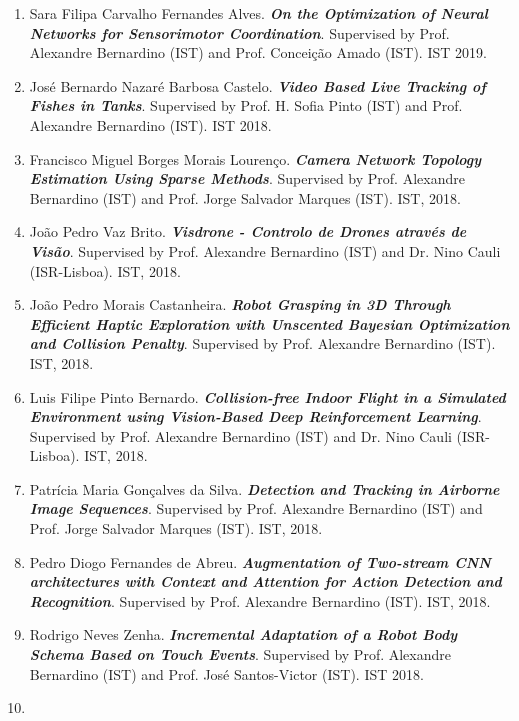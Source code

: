 \begin{enumerate}
  Rui Eduardo Marques Cardoso. \emph{\textbf{Feedback control of
  saccades on a model of a 3D biomimetic robot eye}}. Supervised by
  Prof. Alexandre Bernardino (IST) and Prof. John van Opstal (Radboud
  Univ., Nijmegen, Netherlands). IST 2019.
\item
  Sara Filipa Carvalho Fernandes Alves. \emph{\textbf{On the
  Optimization of Neural Networks for Sensorimotor Coordination}}.
  Supervised by Prof. Alexandre Bernardino (IST) and Prof. Conceição
  Amado (IST). IST 2019.
\item
  José Bernardo Nazaré Barbosa Castelo. \emph{\textbf{Video Based Live
  Tracking of Fishes in Tanks}}. Supervised by Prof. H. Sofia Pinto
  (IST) and Prof. Alexandre Bernardino (IST). IST 2018.
\item
  Francisco Miguel Borges Morais Lourenço. \emph{\textbf{Camera Network
  Topology Estimation Using Sparse Methods}}. Supervised by Prof.
  Alexandre Bernardino (IST) and Prof. Jorge Salvador Marques (IST).
  IST, 2018.
\item
  João Pedro Vaz Brito. \emph{\textbf{Visdrone - Controlo de Drones
  através de Visão}}. Supervised by Prof. Alexandre Bernardino (IST) and
  Dr. Nino Cauli (ISR-Lisboa). IST, 2018.
\item
  João Pedro Morais Castanheira. \emph{\textbf{Robot Grasping in 3D
  Through Efficient Haptic Exploration with Unscented Bayesian
  Optimization and Collision Penalty}}. Supervised by Prof. Alexandre
  Bernardino (IST). IST, 2018.
\item
  Luis Filipe Pinto Bernardo. \emph{\textbf{Collision-free Indoor Flight
  in a Simulated Environment using Vision-Based Deep Reinforcement
  Learning}}. Supervised by Prof. Alexandre Bernardino (IST) and Dr.
  Nino Cauli (ISR-Lisboa). IST, 2018.
\item
  Patrícia Maria Gonçalves da Silva. \emph{\textbf{Detection and
  Tracking in Airborne Image Sequences}}. Supervised by Prof. Alexandre
  Bernardino (IST) and Prof. Jorge Salvador Marques (IST). IST, 2018.
\item
  Pedro Diogo Fernandes de Abreu. \emph{\textbf{Augmentation of
  Two-stream CNN architectures with Context and Attention for Action
  Detection and Recognition}}. Supervised by Prof. Alexandre Bernardino
  (IST). IST, 2018.
\item
  Rodrigo Neves Zenha. \emph{\textbf{Incremental Adaptation of a Robot
  Body Schema Based on Touch Events}}. Supervised by Prof. Alexandre
  Bernardino (IST) and Prof. José Santos-Victor (IST). IST 2018.
\item

\end{enumerate}
